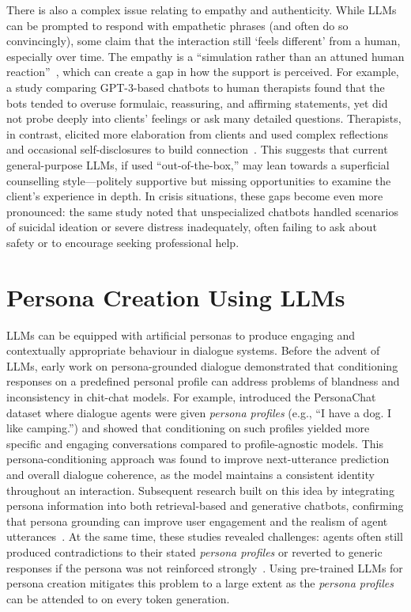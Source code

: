 There is also a complex issue relating to empathy and authenticity. While LLMs can be prompted to respond with empathetic phrases (and often do so convincingly), some claim that the interaction still `feels different' from a human, especially over time. The empathy is a ``simulation rather than an attuned human reaction''~\cite{SEITZ2024100067}, which can create a gap in how the support is perceived. For example, a study comparing GPT-3-based chatbots to human therapists found that the bots tended to overuse formulaic, reassuring, and affirming statements, yet did not probe deeply into clients' feelings or ask many detailed questions. Therapists, in contrast, elicited more elaboration from clients and used complex reflections and occasional self-disclosures to build connection~\cite{Scholich2025}. This suggests that current general-purpose LLMs, if used ``out-of-the-box,'' may lean towards a superficial counselling style---politely supportive but missing opportunities to examine the client's experience in depth. In crisis situations, these gaps become even more pronounced: the same study noted that unspecialized chatbots handled scenarios of suicidal ideation or severe distress inadequately, often failing to ask about safety or to encourage seeking professional help.


\section{Persona Creation Using LLMs}
LLMs can be equipped with artificial personas to produce engaging and contextually appropriate behaviour in dialogue systems. Before the advent of LLMs, early work on persona-grounded dialogue demonstrated that conditioning responses on a predefined personal profile can address problems of blandness and inconsistency in chit-chat models. For example, \citet{zhang-etal-2018-personalizing} introduced the PersonaChat dataset where dialogue agents were given \emph{persona profiles} (e.g., ``I have a dog. I like camping.'') and showed that conditioning on such profiles yielded more specific and engaging conversations compared to profile-agnostic models. This persona-conditioning approach was found to improve next-utterance prediction and overall dialogue coherence, as the model maintains a consistent identity throughout an interaction. Subsequent research built on this idea by integrating persona information into both retrieval-based and generative chatbots, confirming that persona grounding can improve user engagement and the realism of agent utterances~\cite{roller-etal-2021-recipes, li-etal-2016-persona}. At the same time, these studies revealed challenges: agents often still produced contradictions to their stated \emph{persona profiles} or reverted to generic responses if the persona was not reinforced strongly~\cite{kim-etal-2020-will, song-etal-2020-generate}. Using pre-trained LLMs for persona creation mitigates this problem to a large extent as the \emph{persona profiles} can be attended to on every token generation.

